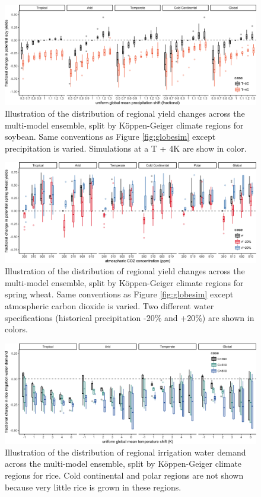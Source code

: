 \documentclass[gmd, manuscript]{copernicus} %
\begin{document}
{\begin{figure}[ht]
\centering
   \includegraphics[width=15cm]{figures/soy_sim_CG_W.png}
   \caption{Illustration of the distribution of regional yield changes across the multi-model ensemble, split by K\"{o}ppen-Geiger climate regions for soybean. Same conventions as Figure \ref{fig:globesim} except precipitation is varied. Simulations at a T + 4K are show in color.}
   \label{fig:globesim_W}
\end{figure}

\begin{figure}[ht]
\centering
   \includegraphics[width=15cm]{figures/swh_sim_CG_C.png}
   \caption{Illustration of the distribution of regional yield changes across the multi-model ensemble, split by K\"{o}ppen-Geiger climate regions for spring wheat. Same conventions as Figure \ref{fig:globesim} except atmospheric carbon dioxide is varied. Two different water specifications (historical precipitation -20\% and +20\%) are shown in colors.}
   \label{fig:globesim_C}
\end{figure}

\begin{figure}[ht]
\centering
   \includegraphics[width=14cm]{figures/rice_sim_CG_irrwat.png}
   \caption{Illustration of the distribution of regional irrigation water demand across the multi-model ensemble, split by K\"{o}ppen-Geiger climate regions for rice. Cold continental and polar regions are not shown because very little rice is grown in these regions.}
   \label{fig:globesim_IRR}
\end{figure}

}
\end{document}
